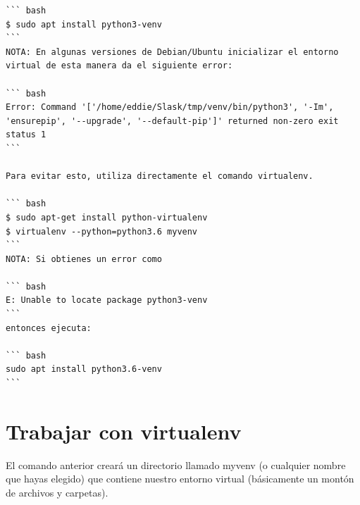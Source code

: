 \documentclass[
  a4paper,
  DIV=11,
  numbers=noendperiod,
  onepage,
  openany]{scrreprt}
\begin{document}
\begin{tcolorbox}
\begin{tcolorbox}
\begin{verbatim}
``` bash
$ sudo apt install python3-venv
```
NOTA: En algunas versiones de Debian/Ubuntu inicializar el entorno virtual de esta manera da el siguiente error:

``` bash
Error: Command '['/home/eddie/Slask/tmp/venv/bin/python3', '-Im', 'ensurepip', '--upgrade', '--default-pip']' returned non-zero exit status 1
```

Para evitar esto, utiliza directamente el comando virtualenv.

``` bash
$ sudo apt-get install python-virtualenv
$ virtualenv --python=python3.6 myvenv
```
NOTA: Si obtienes un error como

``` bash
E: Unable to locate package python3-venv
```
entonces ejecuta:

``` bash
sudo apt install python3.6-venv
```
\end{verbatim}

\end{tcolorbox}

\end{tcolorbox}

\chapter{Trabajar con virtualenv}\label{trabajar-con-virtualenv}

El comando anterior creará un directorio llamado myvenv (o cualquier
nombre que hayas elegido) que contiene nuestro entorno virtual
(básicamente un montón de archivos y carpetas).
\end{document}
